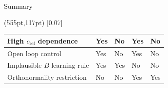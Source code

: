 \documentclass[17pt, t, lualatex]{beamer}
\begin{document}
\begin{frame}{Summary}
	\begin{textblock*}{50pt}(555pt,117pt)
		\scalebox{0.07}[0.07]{
			}
	\end{textblock*}

	\vspace{1.5cm}
	\begin{table}
		\centering
		\begin{tabular}{ L{4.15cm} | C{4.3cm} | C{4.3cm} | C{4.3cm} | C{4.0cm}}
			High $c_\text{ref}$ dependence &  Yes & No &  Yes & No\\
			\hline
			Open loop control&  Yes & No &  Yes & No\\
			\hline
			Implausible $B$ learning rule &  Yes &  Yes & No & No\\
			\hline
			Orthonormality restriction  & No &  No & Yes &  Yes\\
		\end{tabular}
	\end{table}
\end{frame}
\end{document}
